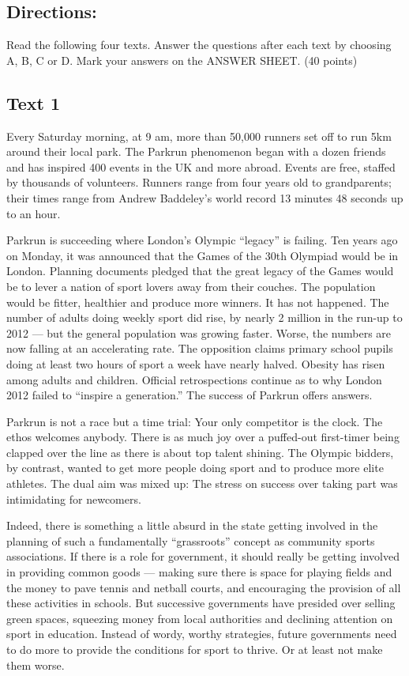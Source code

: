 \documentclass[UTF8,11pt]{ctexart}
\begin{document}
\subsection*{\textbf{Directions:}}


Read the following four texts. Answer the questions after each text by choosing A, B, C or D. Mark your answers on the ANSWER SHEET. (40 points)


\subsection*{\textbf{Text 1}}


Every Saturday morning, at 9 am, more than 50,000 runners set off to run 5km around their local park. The Parkrun phenomenon began with a dozen friends and has inspired 400 events in the UK and more abroad. Events are free, staffed by thousands of volunteers. Runners range from four years old to grandparents; their times range from Andrew Baddeley’s world record 13 minutes 48 seconds up to an hour.


Parkrun is succeeding where London’s Olympic “legacy” is failing. Ten years ago on Monday, it was announced that the Games of the 30th Olympiad would be in London. Planning documents pledged that the great legacy of the Games would be to lever a nation of sport lovers away from their couches. The population would be fitter, healthier and produce more winners. It has not happened. The number of adults doing weekly sport did rise, by nearly 2 million in the run-up to 2012 — but the general population was growing faster. Worse, the numbers are now falling at an accelerating rate. The opposition claims primary school pupils doing at least two hours of sport a week have nearly halved. Obesity has risen among adults and children. Official retrospections continue as to why London 2012 failed to “inspire a generation.” The success of Parkrun offers answers.


Parkrun is not a race but a time trial: Your only competitor is the clock. The ethos welcomes anybody. There is as much joy over a puffed-out first-timer being clapped over the line as there is about top talent shining. The Olympic bidders, by contrast, wanted to get more people doing sport and to produce more elite athletes. The dual aim was mixed up: The stress on success over taking part was intimidating for newcomers.


Indeed, there is something a little absurd in the state getting involved in the planning of such a fundamentally “grassroots” concept as community sports associations. If there is a role for government, it should really be getting involved in providing common goods — making sure there is space for playing fields and the money to pave tennis and netball courts, and encouraging the provision of all these activities in schools. But successive governments have presided over selling green spaces, squeezing money from local authorities and declining attention on sport in education. Instead of wordy, worthy strategies, future governments need to do more to provide the conditions for sport to thrive. Or at least not make them worse.
\end{document}

